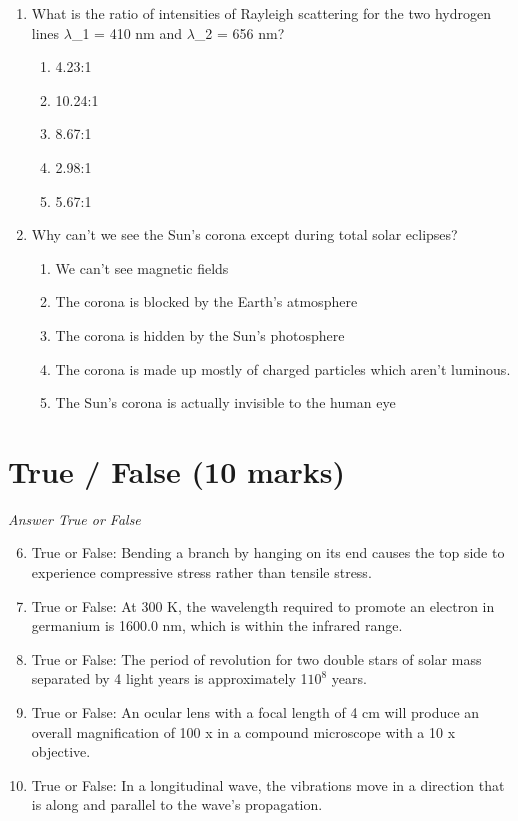 \documentclass[12pt]{article}
\begin{document}
\begin{enumerate}[label=\arabic*.]
\begin{enumerate}[label=(\alph*)]
    \item 250 cm/sec and 12.5 m
    \item 200 cm/sec and 10 m
\end{enumerate}
\item What is the ratio of intensities of Rayleigh scattering for the two hydrogen lines \ensuremath{\lambda}\_1 = 410 nm and \ensuremath{\lambda}\_2 = 656 nm?
\begin{enumerate}[label=(\alph*)]
    \item 4.23:1
    \item 10.24:1
    \item 8.67:1
    \item 2.98:1
    \item 5.67:1
\end{enumerate}
\item Why can't we see the Sun's corona except during total solar eclipses?
\begin{enumerate}[label=(\alph*)]
    \item We can't see magnetic fields
    \item The corona is blocked by the Earth's atmosphere
    \item The corona is hidden by the Sun's photosphere
    \item The corona is made up mostly of charged particles which aren't luminous.
    \item The Sun's corona is actually invisible to the human eye
\end{enumerate}
\end{enumerate}

\section*{True / False (10 marks)}
\textit{Answer True or False}
\begin{enumerate}[label=\arabic*.]
\setcounter{enumi}{5}
\item True or False: Bending a branch by hanging on its end causes the top side to experience compressive stress rather than tensile stress.
\item True or False: At 300 K, the wavelength required to promote an electron in germanium is 1600.0 nm, which is within the infrared range.
\item True or False: The period of revolution for two double stars of solar mass separated by 4 light years is approximately 1$10^8$ years.
\item True or False: An ocular lens with a focal length of 4 cm will produce an overall magnification of 100 x in a compound microscope with a 10 x objective.
\item True or False: In a longitudinal wave, the vibrations move in a direction that is along and parallel to the wave's propagation.
\end{enumerate}
\end{document}
